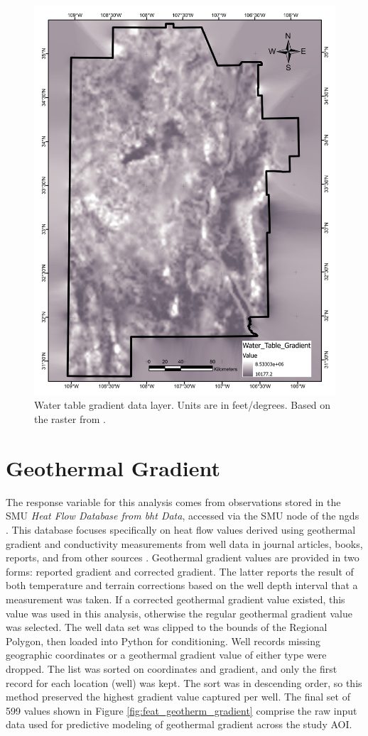 \begin{figure}[H]
\centering
\includegraphics[width=0.75\linewidth]{templates/images/Figure-WTGradient.pdf}
\caption[Water table gradient data layer]{Water table gradient data layer. Units are in feet/degrees. Based on the raster from \protect\citet{bielicki_hydrogeolgic_2015}.}
\label{fig:feat_wt_gradient}
\end{figure}
\pagebreak

\section{Geothermal Gradient}\label{app:dl_geothermal_gradient}
The response variable for this analysis comes from observations stored in the SMU \textit{Heat Flow Database from \acrlong{bht} Data}, accessed via the SMU node of the \acrlong{ngds} \citep{smu_geothermal_2021}. This database focuses specifically on heat flow values derived using geothermal gradient and conductivity measurements from well data in journal articles, books, reports, and from other sources \citep{blackwell_geothermal_2014}. Geothermal gradient values are provided in two forms: reported gradient and corrected gradient. The latter reports the result of both temperature and terrain corrections based on the well depth interval that a measurement was taken. If a corrected geothermal gradient value existed, this value was used in this analysis, otherwise the regular geothermal gradient value was selected. The well data set was clipped to the bounds of the Regional Polygon, then loaded into Python for conditioning. Well records missing geographic coordinates or a geothermal gradient value of either type were dropped. The list was sorted on coordinates and gradient, and only the first record for each location (well) was kept. The sort was in descending order, so this method preserved the highest gradient value captured per well. The final set of 599 values shown in Figure \ref{fig:feat_geotherm_gradient} comprise the raw input data used for predictive modeling of geothermal gradient across the study AOI.
\vfill
\pagebreak

